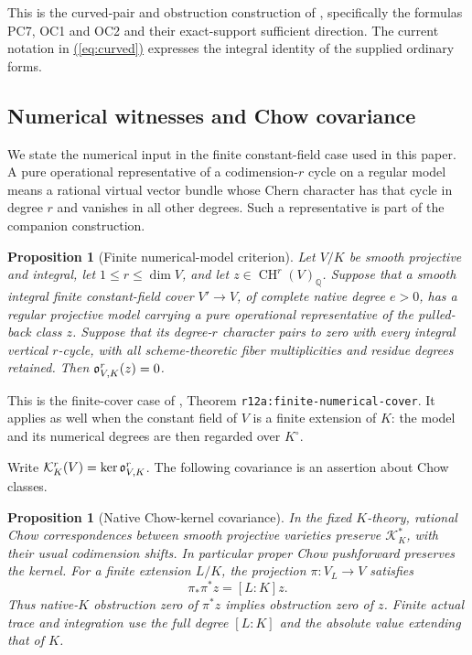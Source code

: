 \documentclass[11pt,a4paper]{article}
\newtheorem{proposition}[theorem]{Proposition}
\theoremstyle{definition}
\theoremstyle{remark}\newtheorem{remark}[theorem]{Remark}
\numberwithin{equation}{section}
\newcommand{\Q}{\mathbb Q}\newcommand{\R}{\mathbb R}\newcommand{\C}{\mathbb C}
\newcommand{\CH}{\operatorname{CH}}\newcommand{\an}{\mathrm{an}}
\renewcommand{\eqref}[1]{\hyperref[#1]{\textcolor{equationlink}{(\ref*{#1})}}}
\begin{document}
This is the curved-pair and obstruction construction of
\cite{InternalGreen}, specifically the formulas PC7, OC1 and OC2 and
their exact-support sufficient direction. The current notation in
\eqref{eq:curved} expresses the integral identity of the supplied
ordinary forms.

\subsection{Numerical witnesses and Chow covariance}\label{sub:covariance}

We state the numerical input in the finite constant-field case used in
this paper. A pure operational representative of a codimension-$r$
cycle on a regular model means a rational virtual vector bundle whose
Chern character has that cycle in degree $r$ and vanishes in all other
degrees. Such a representative is part of the companion construction.

\begin{proposition}[Finite numerical-model criterion]\label{prop:numerical}
Let $V/K$ be smooth projective and integral, let $1\le r\le\dim V$,
and let $z\in\CH^r(V)_\Q$. Suppose that a smooth integral finite
constant-field cover $V'\to V$, of complete native degree $e>0$, has a
regular projective model carrying a pure operational representative of
the pulled-back class $z$. Suppose that its degree-$r$ character pairs
to zero with every integral vertical $r$-cycle, with all
scheme-theoretic fiber multiplicities and residue degrees retained.
Then $\mathfrak o^r_{V,K}(z)=0$.
\end{proposition}

This is the finite-cover case of \cite{InternalNumerical}, Theorem
\texttt{r12a:finite-numerical-cover}. It applies as well when the
constant field of $V$ is a finite extension of $K$: the model and its
numerical degrees are then regarded over $K^\circ$.

Write $\mathcal K_K^r(V)=\ker\mathfrak o^r_{V,K}$. The following covariance
is an assertion about Chow classes.

\begin{proposition}[Native Chow-kernel covariance]\label{prop:covariance}
In the fixed $K$-theory, rational Chow correspondences between smooth
projective varieties preserve $\mathcal K_K^*$, with their usual
codimension shifts. In particular proper Chow pushforward preserves
the kernel. For a finite extension $L/K$, the projection
$\pi:V_L\to V$ satisfies
\[
          \pi_*\pi^*z=[L:K]z.
\]
Thus native-$K$ obstruction zero of $\pi^*z$ implies obstruction zero
of $z$. Finite actual trace and integration use the full degree
$[L:K]$ and the absolute value extending that of $K$.
\end{proposition}
\end{document}
